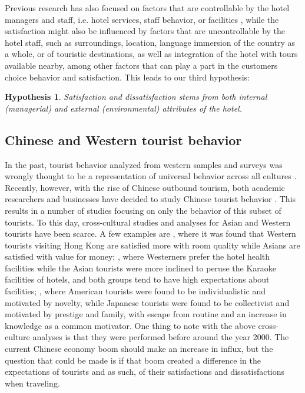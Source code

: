 \documentclass[review]{elsarticle}
\newtheorem{hyp}{Hypothesis}
\begin{document}
Previous research has also focused on factors that are controllable by the hotel managers and staff, i.e. hotel services, staff behavior, or facilities \cite[e.g.][]{shanka2004, choi2001}, while the satisfaction might also be influenced by factors that are uncontrollable by the hotel staff, such as surroundings, location, language immersion of the country as a whole, or of touristic destinations, as well as integration of the hotel with tours available nearby, among other factors that can play a part in the customers choice behavior and satisfaction. 
This leads to our third hypothesis:

\begin{hyp}
\label{hyp:3}
Satisfaction and dissatisfaction stems from both internal (managerial) and external (environmental) attributes of the hotel.
\end{hyp}

\subsection{Chinese and Western tourist behavior}\label{theory_zh_en}

In the past, tourist behavior analyzed from western samples and surveys was wrongly thought to be a representation of universal behavior across all cultures \cite[][]{nielsen2017, jones2010WEIRD, guaratne2009, hogan1978biases}. Recently, however, with the rise of Chinese outbound tourism, both academic researchers and businesses have decided to study Chinese tourist behavior \cite[][]{sun2017}. This results in a number of studies focusing on only the behavior of this subset of tourists. To this day, cross-cultural studies and analyses for Asian and Western tourists have been scarce. A few examples are \cite{choi2000}, where it was found that Western tourists visiting Hong Kong are satisfied more with room quality while Asians are satisfied with value for money; \cite{bauer1993changing}, where Westerners prefer the hotel health facilities while the Asian tourists were more inclined to peruse the Karaoke facilities of hotels, and both groups tend to have high expectations about facilities; \cite{kim2000}, where American tourists were found to be individualistic and motivated by novelty, while Japanese tourists were found to be collectivist and motivated by prestige and family, with escape from routine and an increase in knowledge as a common motivator. One thing to note with the above cross-culture analyses is that they were performed before around the year 2000. The current Chinese economy boom should make an increase in influx, but the question that could be made is if that boom created a difference in the expectations of tourists and as such, of their satisfactions and dissatisfactions when traveling.
\end{document}
